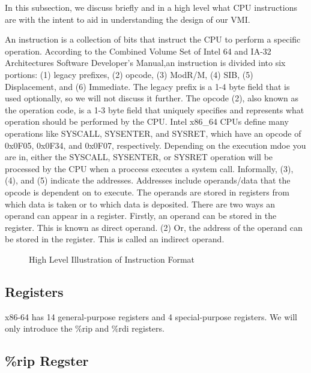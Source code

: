 \documentclass{report}
\begin{document}
\begin{spacing}{1.5}
{\large
In this subsection, we discuss briefly and in a high level what CPU instructions are with the intent to aid in understanding the design of our VMI.
\newline
}

{\large
An instruction is a collection of bits that instruct the CPU to perform a specific operation. According to the Combined Volume Set of Intel 64 and IA-32 Architectures Software Developer’s Manual,an instruction is divided into six portions: (1) legacy prefixes, (2) opcode, (3) ModR/M, (4) SIB, (5) Displacement, and (6) Immediate. The legacy prefix is a 1-4 byte field that is used optionally, so we will not discuss it further. The opcode (2), also known as the operation code, is a 1-3 byte field that uniquely specifies and represents what operation should be performed by the CPU. Intel x86\_64 CPUs define many operations like SYSCALL, SYSENTER, and SYSRET, which have an opcode of 0x0F05, 0x0F34, and 0x0F07, respectively. Depending on the execution mdoe you are in, either the SYSCALL, SYSENTER, or SYSRET operation will be processed by the CPU when a proccess executes a system call. Informally, (3), (4), and (5) indicate the addresses. Addresses include operands/data that the opcode is dependent on to execute. The operands are stored in registers from which data is taken or to which data is deposited. There are two ways an operand can appear in a register. Firstly, an operand can be stored in the register. This is known as direct operand. (2) Or, the address of the operand can be stored in the register. This is called an indirect operand.
\newline
}



\begin{figure}[ht]
    \centering
    \caption{High Level Illustration of Instruction Format}
\end{figure}



\subsection{Registers}

{\large
x86-64 has 14 general-purpose registers and 4 special-purpose registers. We will only introduce the \%rip and \%rdi registers.
\newline
}

\subsection{\%rip Regster}


\end{spacing}
\end{document}
